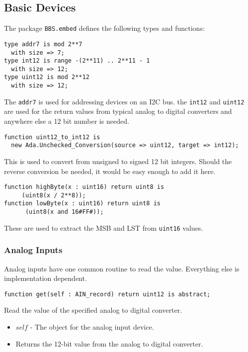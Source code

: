 \documentclass[10pt, openany]{book}
\newcommand{\package}[1]{\texttt{#1}}
\newcommand{\datatype}[1]{\texttt{#1}}
\begin{document}
\subsection{Basic Devices}
The package \package{BBS.embed} defines the following types and functions:
\begin{lstlisting}
type addr7 is mod 2**7
  with size => 7;
type int12 is range -(2**11) .. 2**11 - 1
  with size => 12;
type uint12 is mod 2**12
  with size => 12;
\end{lstlisting}
The \datatype{addr7} is used for addressing devices on an I2C bus.  the \datatype{int12} and \datatype{uint12} are used for the return values from typical analog to digital converters and anywhere else a 12 bit number is needed.
\begin{lstlisting}
function uint12_to_int12 is
  new Ada.Unchecked_Conversion(source => uint12, target => int12);
\end{lstlisting}
This is used to convert from unsigned to signed 12 bit integers.  Should the reverse conversion be needed, it would be easy enough to add it here.
\begin{lstlisting}
function highByte(x : uint16) return uint8 is
     (uint8(x / 2**8));
function lowByte(x : uint16) return uint8 is
      (uint8(x and 16#FF#));
\end{lstlisting}
These are used to extract the MSB and LST from \datatype{uint16} values.

\subsubsection{Analog Inputs}
Analog inputs have one common routine to read the value.  Everything else is implementation dependent.
\begin{lstlisting}
function get(self : AIN_record) return uint12 is abstract;
\end{lstlisting}
Read the value of the specified analog to digital converter.
\begin{itemize}
  \item $self$ - The object for the analog input device.
  \item Returns the 12-bit value from the analog to digital converter.
\end{itemize}
\end{document}
